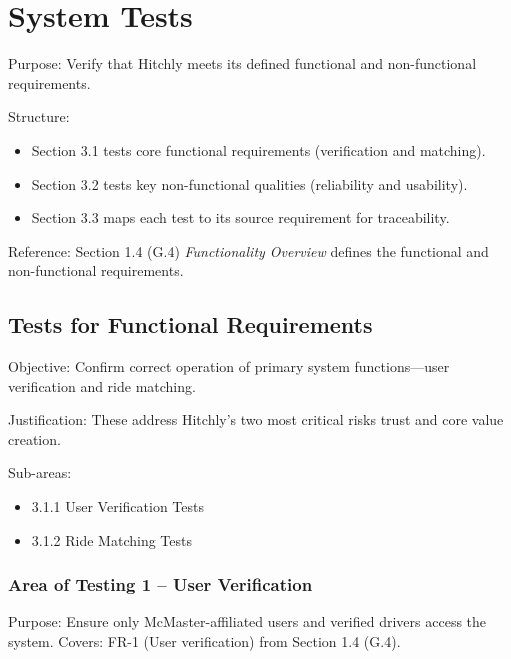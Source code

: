 \documentclass[12pt, titlepage]{article}
\begin{document}
\section{System Tests}

Purpose: Verify that Hitchly meets its defined functional and non-functional requirements.

Structure: 
\begin{itemize}
    \item Section 3.1 tests core functional requirements (verification and matching).
    \item Section 3.2 tests key non-functional qualities (reliability and usability).
    \item Section 3.3 maps each test to its source requirement for traceability.
\end{itemize}

Reference: Section 1.4 (G.4) \textit{Functionality Overview} defines the functional and non-functional requirements.

\subsection{Tests for Functional Requirements}

Objective: Confirm correct operation of primary system functions—user verification and ride matching.

Justification: These address Hitchly’s two most critical risks trust and core value creation.

Sub-areas:
\begin{itemize}
    \item 3.1.1 User Verification Tests
    \item 3.1.2 Ride Matching Tests
\end{itemize}

\subsubsection{Area of Testing 1 – User Verification}

Purpose: Ensure only McMaster-affiliated users and verified drivers access the system.  
Covers: FR-1 (User verification) from Section 1.4 (G.4).
\end{document}
